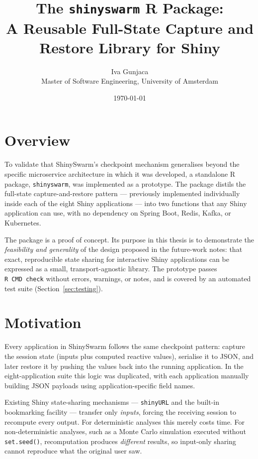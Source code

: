 \documentclass[11pt,a4paper]{article}
\title{The \texttt{shinyswarm} R Package:\\
  A Reusable Full-State Capture and Restore Library for Shiny}
\author{Iva Gunjaca\\Master of Software Engineering, University of Amsterdam}
\date{\today}
\begin{document}
\maketitle

\section{Overview}

To validate that ShinySwarm's checkpoint mechanism generalises beyond the
specific microservice architecture in which it was developed, a standalone R
package, \texttt{shinyswarm}, was implemented as a prototype. The package
distils the full-state capture-and-restore pattern --- previously implemented
individually inside each of the eight Shiny applications --- into two functions
that any Shiny application can use, with no dependency on Spring Boot, Redis,
Kafka, or Kubernetes.

The package is a proof of concept. Its purpose in this thesis is to demonstrate
the \emph{feasibility and generality} of the design proposed in the future-work
notes: that exact, reproducible state sharing for interactive Shiny applications
can be expressed as a small, transport-agnostic library. The prototype passes
\texttt{R~CMD~check} without errors, warnings, or notes, and is covered by an
automated test suite (Section~\ref{sec:testing}).

\section{Motivation}

Every application in ShinySwarm follows the same checkpoint pattern: capture the
session state (inputs plus computed reactive values), serialise it to JSON, and
later restore it by pushing the values back into the running application. In the
eight-application suite this logic was duplicated, with each application manually
building JSON payloads using application-specific field names.

Existing Shiny state-sharing mechanisms --- \texttt{shinyURL} and the built-in
bookmarking facility --- transfer only \emph{inputs}, forcing the receiving
session to recompute every output. For deterministic analyses this merely costs
time. For non-deterministic analyses, such as a Monte Carlo simulation executed
without \texttt{set.seed()}, recomputation produces \emph{different} results, so
input-only sharing cannot reproduce what the original user saw.
\end{document}

